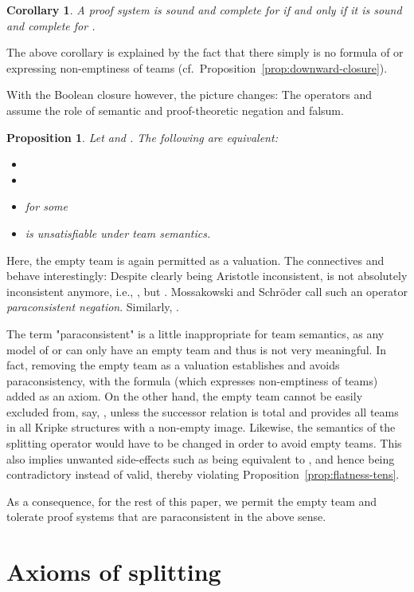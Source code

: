 \documentclass[a4paper,english,fleqn,11pt,final]{scrartcl}
\makeatletter
\newcommand{\ie}{i.e.\@\xspace}
\theoremstyle{plain}
\newtheorem{proposition}[theorem]{Proposition}
\newtheorem{corollary}[theorem]{Corollary}
\theoremstyle{definition}
\makeatother
\begin{document}
\begin{corollary}
A proof system is sound and complete for  if and only if it is sound and complete for .
\end{corollary}

The above corollary is explained by the fact that there simply is no formula of  or  expressing non-emptiness of teams (cf.\ Proposition~\ref{prop:downward-closure}).

With the Boolean closure  however, the picture changes:
The operators  and  assume the role of semantic and proof-theoretic negation and falsum.
\begin{proposition}
Let  and .
The following are equivalent:
\begin{itemize}
\item 
\item 
\item  for some 
\item  is unsatisfiable under team semantics.
\end{itemize}
\end{proposition}

Here, the empty team is again permitted as a valuation.
The connectives  and  behave interestingly:
Despite clearly being Aristotle inconsistent,  is not 
absolutely inconsistent anymore, \ie, , but .
Mossakowski and Schröder call such an operator   \emph{paraconsistent negation}.
Similarly, .

The term "paraconsistent" is a little inappropriate for team semantics, as any model of  or  can only have an empty team and thus is not very meaningful.
In fact, removing the empty team as a valuation establishes  and avoids paraconsistency,
with the formula  (which expresses non-emptiness of teams) added as an axiom.
On the other hand, the empty team cannot be easily excluded from, say, , unless the successor relation is total and provides all teams in all Kripke structures with a non-empty image.
Likewise, the semantics of the splitting operator  would have to be changed in order to avoid empty teams.
This also implies unwanted side-effects such as  being equivalent to , and hence being contradictory instead of valid, thereby violating Proposition~\ref{prop:flatness-tens}.

As a consequence, for the rest of this paper, we permit the empty team and tolerate proof systems that are paraconsistent in the above sense.


  
\section{Axioms of splitting}
\end{document}
